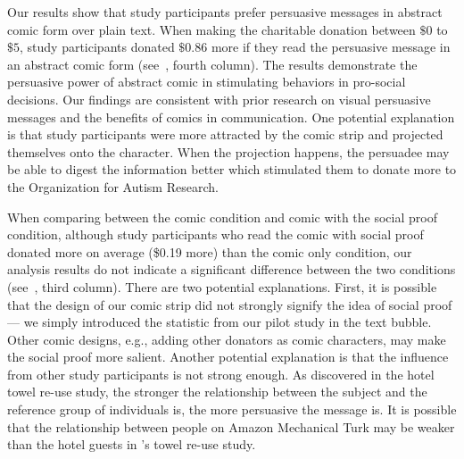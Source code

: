 \begin{description} [leftmargin=\parindent,topsep=0pt,partopsep=3pt,parsep=0pt,itemsep=3pt, listparindent=\parindent]
    \item[Comic vs. Plain Text:] Our results show that study participants prefer persuasive messages in abstract comic form over plain text. When making the charitable donation between $\$0$ to $\$5$, study participants donated $\$ 0.86$ more if they read the persuasive message in an abstract comic form (see~, fourth column). The results demonstrate the persuasive power of abstract comic in stimulating behaviors in pro-social decisions. Our findings are consistent with prior research on visual persuasive messages and the benefits of comics in communication. One potential explanation is that study participants were more attracted by the comic strip and projected themselves onto the character. When the projection happens, the persuadee may be able to digest the information better which stimulated them to donate more to the Organization for Autism Research. 
    
    \item[Social Proof Condition:] When comparing between the comic condition and comic with the social proof condition, although study participants who read the comic with social proof donated more on average (\$0.19 more) than the comic only condition, our analysis results do not indicate a significant difference between the two conditions (see~, third column). 
    There are two potential explanations. First, it is possible that the design of our comic strip did not strongly signify the idea of social proof --- we simply introduced the statistic from our pilot study in the text bubble. Other comic designs, e.g., adding other donators as comic characters, may make the social proof more salient. Another potential explanation is that the influence from other study participants is not strong enough. As \textcite{goldstein2008room} discovered in the hotel towel re-use study, the stronger the relationship between the subject and the reference group of individuals is, the more persuasive the message is. It is possible that the relationship between people on Amazon Mechanical Turk may be weaker than the hotel guests in \textcite{goldstein2008room}'s towel re-use study.


\end{description}
